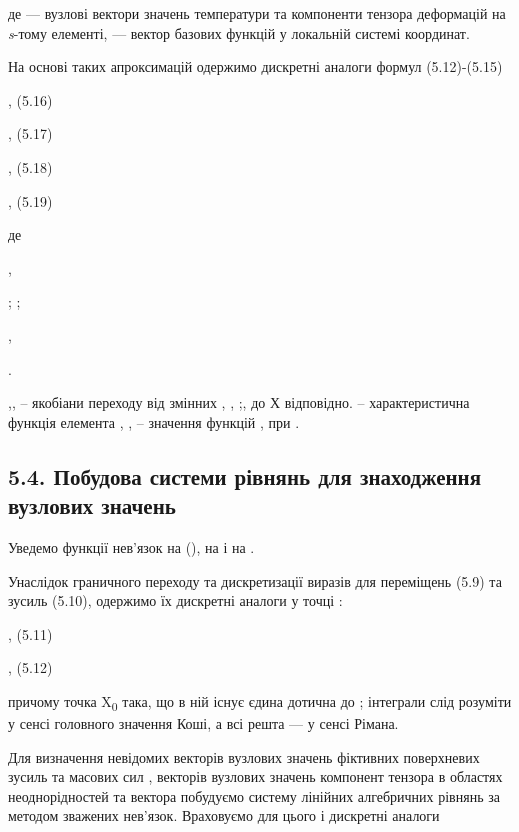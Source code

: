 де --- вузлові вектори значень температури та компоненти тензора
деформацій на \emph{s}-тому елементі, --- вектор базових функцій у
локальній системі координат.

На основі таких апроксимацій одержимо дискретні аналоги формул
(5.12)-(5.15)

, (5.16)

, (5.17)

, (5.18)

, (5.19)

де

,

; ;

,

.

,, -- якобіани переходу від змінних , , ;, до Х відповідно. --
характеристична функція елемента , , -- значення функцій , при .

\hypertarget{ux43fux43eux431ux443ux434ux43eux432ux430-ux441ux438ux441ux442ux435ux43cux438-ux440ux456ux432ux43dux44fux43dux44c-ux434ux43bux44f-ux437ux43dux430ux445ux43eux434ux436ux435ux43dux43dux44f-ux432ux443ux437ux43bux43eux432ux438ux445-ux437ux43dux430ux447ux435ux43dux44c-2}{%
\subsection{5.4. Побудова системи рівнянь для знаходження вузлових
значень}\label{ux43fux43eux431ux443ux434ux43eux432ux430-ux441ux438ux441ux442ux435ux43cux438-ux440ux456ux432ux43dux44fux43dux44c-ux434ux43bux44f-ux437ux43dux430ux445ux43eux434ux436ux435ux43dux43dux44f-ux432ux443ux437ux43bux43eux432ux438ux445-ux437ux43dux430ux447ux435ux43dux44c-2}}

Уведемо функції нев'язок на (), на і на .

Унаслідок граничного переходу та дискретизації виразів для переміщень
(5.9) та зусиль (5.10), одержимо їх дискретні аналоги у точці :

, (5.11)

, (5.12)

причому точка X\textsubscript{0} така, що в ній існує єдина дотична до ;
інтеграли слід розуміти у сенсі головного значення Коші, а всі решта ---
у сенсі Рімана.

Для визначення невідомих векторів вузлових значень фіктивних поверхневих
зусиль та масових сил , векторів вузлових значень компонент тензора в
областях неоднорідностей та вектора побудуємо систему лінійних
алгебричних рівнянь за методом зважених нев'язок. Враховуємо для цього і
дискретні аналоги

